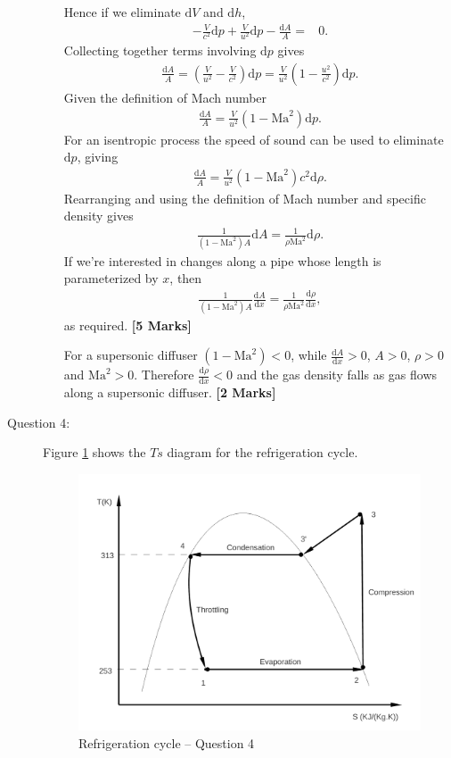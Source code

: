 \documentclass[12pt,twoside]{report}
\renewcommand{\d}{\mathrm{d}}
\newcommand{\fracd}[2]{\frac{\mathrm{d} #1}{\mathrm{d} #2}}
\renewcommand{\d}[1]{\mathrm{d} #1}
\newcommand{\Ma}{\mathrm{M\! a}}
\begin{document}
\begin{description}
\begin{itemize}
Hence if we eliminate $\d{V}$ and $\d{h}$,
\begin{align*}
 -\frac{V}{c^2} \d{p} + \frac{V}{u^2} \d{p} - \frac{\d{A}}{A} =& 0.
\end{align*}
Collecting together terms involving $\d{p}$ gives
\begin{align*}
 \frac{\d{A}}{A} = \left(\frac{V}{u^2} - \frac{V}{c^2}\right) \d{p} = \frac{V}{u^2}\left(1 - \frac{u^2}{c^2}\right) \d{p}.
\end{align*}
Given the definition of Mach number
\begin{align*}
 \frac{\d{A}}{A} = \frac{V}{u^2}\left(1 - \Ma^2\right) \d{p}.
\end{align*}
For an isentropic process the speed of sound can be used to eliminate $\d{p}$, giving
\begin{align*}
 \frac{\d{A}}{A} = \frac{V}{u^2}\left(1 - \Ma^2\right) c^2 \d{\rho}.
\end{align*}
Rearranging and using the definition of Mach number and specific density gives
\begin{align*}
 \frac{1}{\left(1 - \Ma^2\right) A} \d{A} = \frac{1}{\rho \Ma^2} \d{\rho}.
\end{align*}
If we're interested in changes along a pipe whose length is parameterized by $x$, then
\begin{align*}
 \frac{1}{\left(1 - \Ma^2\right) A} \fracd{A}{x} = \frac{1}{\rho \Ma^2} \fracd{\rho}{x},
\end{align*}
as required. \hfill \textbf{[5 Marks]}

For a supersonic diffuser $\left(1 - \Ma^2\right) < 0$, while $\fracd{A}{x} > 0$, $A>0$, $\rho>0$ and $\Ma^2>0$. Therefore $\fracd{\rho}{x} < 0$ and the gas density falls as gas flows along a supersonic diffuser. \hfill \textbf{[2 Marks]}
\end{itemize}

\clearpage


\item [Question 4:] Figure \ref{exam_refrig1} shows the $Ts$ diagram for the refrigeration cycle.

\begin{figure}[h]
\begin{center}
\includegraphics[width=10.cm,clip]{./Pics/Exam_Refrigeration1}
\caption{ Refrigeration cycle -- Question 4}
\label{exam_refrig1}
\end{center}
\end{figure}



\end{description}
\end{document}

